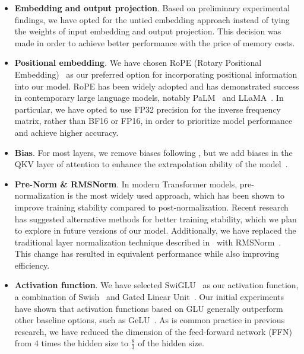 \begin{itemize}
    \item \textbf{Embedding and output projection}. Based on preliminary experimental findings, we have opted for the untied embedding approach instead of tying the weights of input embedding and output projection. This decision was made in order to achieve better performance with the price of memory costs.
    \item \textbf{Positional embedding}. We have chosen RoPE (Rotary Positional Embedding)~\citep{rope} as our preferred option for incorporating positional information into our model. RoPE has been widely adopted and has demonstrated success in contemporary large language models, notably PaLM~\citep{palm, palm2} and LLaMA~\citep{llama, llama2}. In particular, we have opted to use FP32 precision for the inverse frequency matrix, rather than BF16 or FP16, in order to prioritize model performance and achieve higher accuracy.
    \item \textbf{Bias}. For most layers, we remove biases following \citet{palm}, but we add biases in the QKV layer of attention to enhance the extrapolation ability of the model~\citep{qkv_bias}.
    \item \textbf{Pre-Norm \& RMSNorm}. In modern Transformer models, pre-normalization is the most widely used approach, which has been shown to improve training stability compared to post-normalization. Recent research has suggested alternative methods for better training stability, which we plan to explore in future versions of our model. Additionally, we have replaced the traditional layer normalization technique described in~\citep{layer_norm} with RMSNorm~\citep{rmsnorm}. This change has resulted in equivalent performance while also improving efficiency.
    \item \textbf{Activation function}. We have selected SwiGLU~\citep{noamglu} as our activation function, a combination of Swish~\citep{swish} and Gated Linear Unit~\citep{glu}. Our initial experiments have shown that activation functions based on GLU generally outperform other baseline options, such as GeLU~\citep{gelu}. As is common practice in previous research, we have reduced the dimension of the feed-forward network (FFN) from \num{4} times the hidden size to $\frac{8}{3}$ of the hidden size.
\end{itemize}

